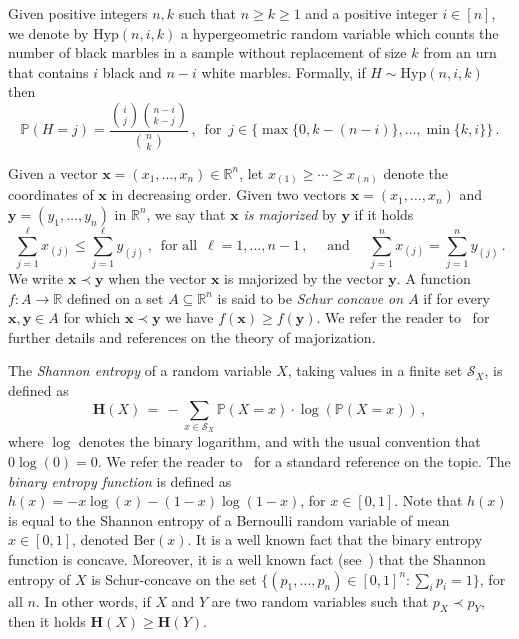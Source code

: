 \documentclass[11pt]{article}
\newcommand{\Prb}{\mathbb{P}}
\newcommand{\bh}{\mathbf{H}}
\begin{document}
Given positive integers 
$n,k$ such that $n\ge k\ge 1$ and a positive integer $i\in [n]$, we denote by $\text{Hyp}(n,i,k)$ a hypergeometric random variable which counts the number of black marbles in a sample without replacement of size $k$ from an urn that contains $i$
black and $n - i$ white marbles. 
Formally, if $H\sim\text{Hyp}(n,i,k)$ then  
\[
\Prb(H=j)=\frac{\binom{i}{j}\binom{n-i}{k-j}}{\binom{n}{k}}\, , \, \text{ for }  \, j\in\{\max\{0,k-(n-i)\},\dots,\min\{k,i\}\} \, . 
\]

Given a vector $\mathbf{x}= (x_1,\ldots,x_n)\in\mathbb{R}^n$, let  $x_{(1)} \ge \cdots \ge x_{(n)}$ denote the coordinates of $\mathbf{x}$ in decreasing order. 
Given two vectors $\mathbf{x}= (x_1,\ldots,x_n)$ and $\mathbf{y}= (y_1,\ldots,y_n)$  in $\mathbb{R}^n$, we say that $\mathbf{x}$ \textit{is majorized} 
by $\mathbf{y}$ if it holds 
\[
\sum_{j=1}^{\ell} x_{(j)} \le \sum_{j=1}^{\ell} y_{(j)}\, , \,  \text{ for all } \, \ell=1,\ldots,n-1 \, , \quad \text{ and } \quad \sum_{j=1}^{n} x_{(j)} = \sum_{j=1}^{n} y_{(j)} \, . 
\]
We write $\mathbf{x}\prec\mathbf{y}$ when the vector  $\mathbf{x}$  is majorized by the vector $\mathbf{y}$. 
A function $f:A\to \mathbb{R}$ defined on a set $A\subseteq\mathbb{R}^n$ is said to be \emph{Schur concave on $A$} if for every $\mathbf{x},\mathbf{y}\in A$ for which  $\mathbf{x}\prec \mathbf{y}$ we have $f(\mathbf{x})\ge f(\mathbf{y})$. We refer the reader to~\cite{Marshall_Olkin_Arnold} for further details and references on the theory of majorization.  

The \emph{Shannon entropy} of 
a random variable $X$, taking values in a finite set $\mathcal{S}_X$, is defined as  
\[
\bh(X) \,=\, -\sum_{x\in\mathcal{S}_X} \Prb(X=x)\cdot \log(\Prb(X=x)) \, ,
\]
where $\log$ denotes the binary logarithm, and with the usual convention that $0\log(0)=0$. We refer the reader to~\cite{Cover_Thomas} for a standard reference on the topic. 
The \emph{binary entropy function} is defined as $h(x)=-x\log(x)-(1-x)\log(1-x)$, for $x\in [0,1]$. Note that $h(x)$ is equal to the Shannon entropy of a Bernoulli random variable of mean $x\in [0,1]$, denoted $\text{Ber}(x)$. 
It is a well known fact that the binary entropy function is concave. 
Moreover, it is a well known fact (see~\cite[p.~101]{Marshall_Olkin_Arnold}) that 
the Shannon entropy of $X$ is  Schur-concave on the set $\{(p_1,\ldots,p_n)\in [0,1]^n : \sum_ip_i=1\}$, for all $n$. In other words, if $X$ and $Y$  are two random variables such that $p_X\prec p_Y$, then it holds 
$\bh(X)\ge \bh(Y)$. 
\end{document}
